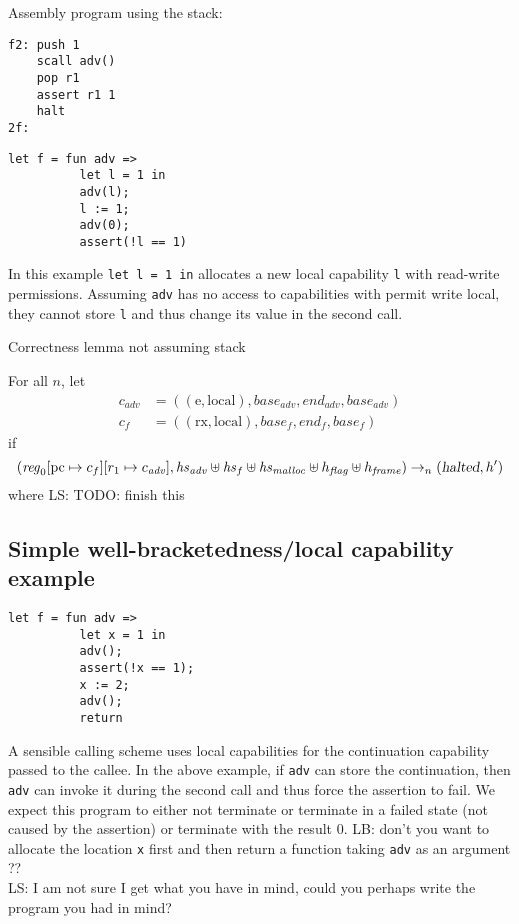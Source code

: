 \documentclass[a4paper]{article}
\newcommand{\update}[2]{[#1 \mapsto #2]}
\newcommand\lau[1]{{\color{purple} \sf \footnotesize {LS: #1}}\\}
\newcommand\lars[1]{{\color{purple} \sf \footnotesize {LB: #1}}\\}
\newcommand{\var}[1]{\mathit{#1}}
\newcommand{\hs}{\var{hs}}
\newcommand{\pcreg}{\mathrm{pc}}
\newcommand{\start}{\var{base}}
\newcommand{\addrend}{\var{end}}
\newcommand{\reg}{\var{reg}}
\newcommand{\adv}{\var{adv}}
\newcommand{\flag}{\var{flag}}
\newcommand{\halted}{\textsl{halted}}
\newcommand{\codelabel}[1]{\mathit{#1}}
\newcommand{\malloc}{\codelabel{malloc}}
\newcommand{\plainperm}[1]{\mathrm{#1}}
\newcommand{\exec}{\plainperm{rx}}
\newcommand{\entry}{\plainperm{e}}
\newcommand{\local}{\plainperm{local}}
\newcommand{\step}[1][]{\rightarrow_{#1}}
\begin{document}
Assembly program using the stack:
\begin{verbatim}
f2: push 1
    scall adv()
    pop r1
    assert r1 1
    halt
2f:
\end{verbatim}

\begin{verbatim}
let f = fun adv =>
          let l = 1 in
          adv(l);
          l := 1;
          adv(0);
          assert(!l == 1)
\end{verbatim}
In this example \texttt{let l = 1 in} allocates a new local capability \texttt{l} with read-write permissions. Assuming \texttt{adv} has no access to capabilities with permit write local, they cannot store \texttt{l} and thus change its value in the second call.



Correctness lemma not assuming stack
\begin{lemma}
  For all $n$,
  let
  \begin{align*}
    c_\adv & = ((\entry,\local),\start_\adv,\addrend_\adv,\start_\adv) \\
    c_f & = ((\exec,\local),\start_f,\addrend_f,\start_f)
  \end{align*}
  if
  \[
    (\reg_0\update{\pcreg}{c_f}\update{r_1}{c_\adv},\hs_\adv \uplus \hs_f \uplus \hs_\malloc \uplus h_\flag \uplus h_\var{frame}) \step[n] (\halted, h')
  \]
  where
\lau{TODO: finish this}
\end{lemma}


\subsection{Simple well-bracketedness/local capability example}
\begin{verbatim}
let f = fun adv =>
          let x = 1 in
          adv();
          assert(!x == 1);
          x := 2;
          adv();
          return
\end{verbatim}
A sensible calling scheme uses local capabilities for the continuation capability passed to the callee. In the above example, if \texttt{adv} can store the continuation, then 
\texttt{adv} can invoke it during the second call and thus force the assertion to fail. We expect this program to either not terminate or terminate in a failed state (not caused by the assertion) or terminate with the result 0.
\lars{don't you want to allocate the location \texttt{x} first and then
  return a function taking \texttt{adv} as an argument ??}
\lau{I am not sure I get what you have in mind, could you perhaps write the program you had in mind?}
\end{document}
